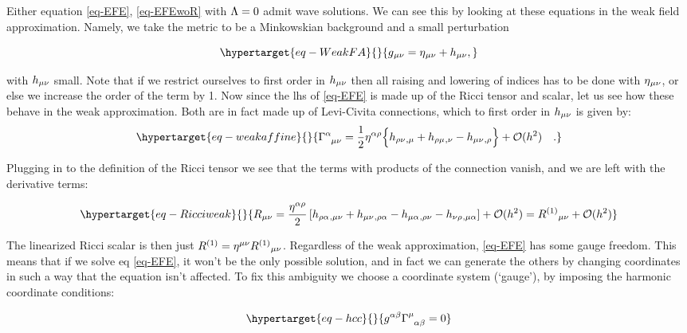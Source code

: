 \documentclass[
  10pt,
  a4paper,
  DIV=11,
  numbers=noendperiod,
  twoside]{scrreprt}
\DeclareRobustCommand{\[}{\begin{equation}}
\DeclareRobustCommand{\]}{\end{equation}}
\begin{document}
Either equation \ref{eq-EFE}, \ref{eq-EFEwoR} with \(\Lambda=0\) admit
wave solutions. We can see this by looking at these equations in the
weak field approximation. Namely, we take the metric to be a Minkowskian
background and a small perturbation

\begin{equation}\protect\hypertarget{eq-WeakFA}{}{
    \met = \mink + \weakmet,
}\label{eq-WeakFA}\end{equation}

with \(h{}_{\mu\nu}\) small. Note that if we restrict ourselves to first
order in \(h{}_{\mu\nu}\) then all raising and lowering of indices has to be
done with \(\eta{}_{\mu\nu}\), or else we increase the order of the term by 1. Now
since the \gls{lhs} of \ref{eq-EFE} is made up of the Ricci tensor and
scalar, let us see how these behave in the weak approximation. Both are
in fact made up of Levi-Civita connections, which to first order in
\(h{}_{\mu\nu}\) is given by:
\begin{equation}\protect\hypertarget{eq-weakaffine}{}{\LC{\alpha}{\mu}{\nu} = \frac{1}{2} \invmink[\alpha \rho]
\brk[\Big]{
    \ipdv{ \weakmet[\rho \nu]}{\mu}
    +\ipdv{ \weakmet[\rho \mu]}{\nu}
    -\ipdv{ \weakmet}{\rho}} + \order[2]{h}\quad .}\label{eq-weakaffine}\end{equation}

Plugging in to the definition of the Ricci tensor we see that the terms
with products of the connection vanish, and we are left with the
derivative terms:

\begin{equation}\protect\hypertarget{eq-Ricciweak}{}{ 
\RicciTco  =
 \frac{\invmink[\alpha\rho]}{2}\left[ \ipdv{\weakmet[\rho\alpha]}{\mu\nu} + \ipdv{\weakmet}{\rho\alpha} - \ipdv{\weakmet[\mu\alpha]}{\rho\nu} - \ipdv{\weakmet[\nu\rho]}{\mu\alpha} \right] + \mathcal{O}(h^2)=\linRicciTco+ \mathcal{O}(h^2)
}\label{eq-Ricciweak}\end{equation}

The linearized Ricci scalar is then just
\(R^{(1)}=\eta{}^{\mu\nu}R^{(1)}{}_{\mu\nu}\). Regardless of the weak
approximation, \ref{eq-EFE} has some gauge freedom. This means that if
we solve eq \ref{eq-EFE}, it won't be the only possible solution, and in
fact we can generate the others by changing coordinates in such a way
that the equation isn't affected. To fix this ambiguity we choose a
coordinate system (`gauge'), by imposing the harmonic coordinate
conditions:

\begin{equation}\protect\hypertarget{eq-hcc}{}{ 
   \invmet[\alpha\beta]\LC{\mu}{\alpha}{\beta} =0
}\label{eq-hcc}\end{equation}
\end{document}
